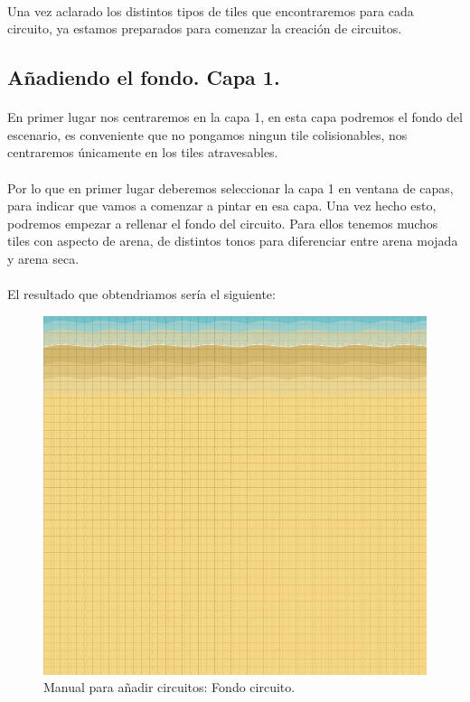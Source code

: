 \paragraph{}
Una vez aclarado los distintos tipos de tiles que encontraremos para cada circuito, ya estamos preparados para comenzar la creación
de circuitos.

\subsection{Añadiendo el fondo. Capa 1.}

\paragraph{}
En primer lugar nos centraremos en la capa 1, en esta capa podremos el fondo del escenario, es conveniente que no pongamos ningun 
tile colisionables, nos centraremos únicamente en los tiles atravesables.

\paragraph{}
Por lo que en primer lugar deberemos seleccionar la capa 1 en ventana de capas, para indicar que vamos a comenzar a pintar en esa
capa. Una vez hecho esto, podremos empezar a rellenar el fondo del circuito. Para ellos tenemos muchos tiles con aspecto de arena,
de distintos tonos para diferenciar entre arena mojada y arena seca.

\paragraph{}
El resultado que obtendriamos sería el siguiente:

\begin{figure}[H]
  \label{circuito_fondo2}
  \begin{center}
    \includegraphics[scale=0.5]{imagenes/manualcircuito/circuito_fondo2.png}
  \end{center}
  \caption{Manual para añadir circuitos: Fondo circuito.}
\end{figure}

